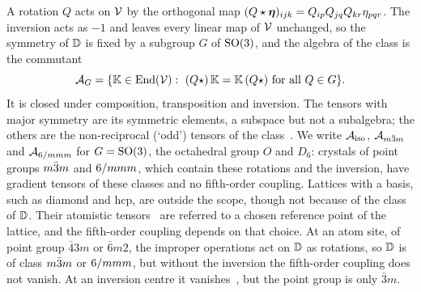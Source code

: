 A rotation $Q$ acts on $\mathcal{V}$ by the orthogonal map
$(Q\star\bm{\eta})_{ijk}=Q_{ip}Q_{jq}Q_{kr}\eta_{pqr}$. The inversion acts as $-1$ and
leaves every linear map of $\mathcal{V}$ unchanged, so the symmetry of $\mathbb{D}$ is fixed by a
subgroup $G$ of $\mathrm{SO}(3)$, and the algebra of the class is the commutant
\begin{equation}
\Alg{G}=\{\tK\in\End(\Vsg):\ (Q\star)\,\tK=\tK\,(Q\star)\ \text{for all } Q\in G\}.
\label{eq:commutant}
\end{equation}
It is closed under composition, transposition and inversion. The tensors with major
symmetry are its symmetric elements, a subspace but not a subalgebra; the others are the
non-reciprocal (`odd') tensors of the class~\cite{Poorsolhjouy2026}. We write
$\mathcal{A}_{\mathrm{iso}}$, $\mathcal{A}_{m\bar{3}m}$ and $\mathcal{A}_{6/mmm}$ for $G=\mathrm{SO}(3)$, the octahedral group
$O$ and $D_6$: crystals of point groups $m\bar{3}m$ and $6/mmm$, which contain these
rotations and the inversion, have gradient tensors of these classes and no fifth-order
coupling. Lattices with a basis, such as diamond and hcp, are outside the scope, though
not because of the class of $\mathbb{D}$. Their atomistic tensors~\cite{Admal2017} are
referred to a chosen reference point of the lattice, and the fifth-order coupling depends
on that choice. At an atom site, of point group $\bar43m$ or $\bar6m2$, the improper
operations act on $\mathbb{D}$ as rotations, so $\mathbb{D}$ is of class $m\bar{3}m$ or $6/mmm$, but
without the inversion the fifth-order coupling does not vanish. At an inversion centre
it vanishes~\cite[theorem~1]{Admal2017}, but the point group is only $\bar3m$.

